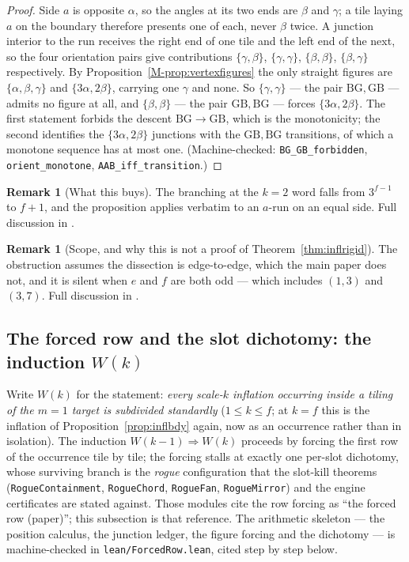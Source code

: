 \documentclass[11pt,reqno]{amsart}
\theoremstyle{plain}
\theoremstyle{definition}
\newtheorem{remark}[theorem]{Remark}
\begin{document}
\begin{proof}
Side $a$ is opposite $\alpha$, so the angles at its two ends are $\beta$ and $\gamma$; a tile laying
$a$ on the boundary therefore presents one of each, never $\beta$ twice. A junction interior to the run
receives the right end of one tile and the left end of the next, so the four orientation pairs give
contributions $\{\gamma,\beta\}$, $\{\gamma,\gamma\}$, $\{\beta,\beta\}$, $\{\beta,\gamma\}$
respectively. By Proposition~\ref{M-prop:vertexfigures} the only straight figures are
$\{\alpha,\beta,\gamma\}$ and $\{3\alpha,2\beta\}$, carrying one $\gamma$ and none. So
$\{\gamma,\gamma\}$ --- the pair $\mathrm{BG},\mathrm{GB}$ --- admits no figure at all, and
$\{\beta,\beta\}$ --- the pair $\mathrm{GB},\mathrm{BG}$ --- forces $\{3\alpha,2\beta\}$. The first
statement forbids the descent $\mathrm{BG}\to\mathrm{GB}$, which is the monotonicity; the second
identifies the $\{3\alpha,2\beta\}$ junctions with the $\mathrm{GB},\mathrm{BG}$ transitions, of which
a monotone sequence has at most one. \textup{(}Machine-checked: \texttt{BG\_GB\_forbidden},
\texttt{orient\_monotone}, \texttt{AAB\_iff\_transition}.\textup{)}
\end{proof}

\begin{remark}[What this buys]\label{rem:orientmono}
The branching at the $k=2$ word falls from $3^{f-1}$ to $f+1$, and the proposition applies verbatim to an $a$-run on an equal side. Full discussion in \cite{Obstructions}.
\end{remark}

\begin{remark}[Scope, and why this is not a proof of Theorem~\ref{thm:inflrigid}]\label{rem:inflparity}
The obstruction assumes the dissection is edge-to-edge, which the main paper does not, and it is silent when $e$ and $f$ are both odd --- which includes $(1,3)$ and $(3,7)$. Full discussion in \cite{Obstructions}.
\end{remark}

\subsection{The forced row and the slot dichotomy: the induction \texorpdfstring{$W(k)$}{W(k)}}\label{sub:forcedrow}

Write $W(k)$ for the statement: \emph{every scale-$k$ inflation occurring inside a tiling of the
$m=1$ target is subdivided standardly} ($1\le k\le f$; at $k=f$ this is the inflation of
Proposition~\ref{prop:inflbdy} again, now as an occurrence rather than in isolation). The
induction $W(k-1)\Rightarrow W(k)$ proceeds by forcing the first row of the occurrence tile by
tile; the forcing stalls at exactly one per-slot dichotomy, whose surviving branch is the
\emph{rogue} configuration that the slot-kill theorems
(\texttt{RogueContainment}, \texttt{RogueChord}, \texttt{RogueFan}, \texttt{RogueMirror}) and the
engine certificates are stated against. Those modules cite the row forcing as ``the forced row
(paper)''; this subsection is that reference. The arithmetic skeleton --- the position calculus,
the junction ledger, the figure forcing and the dichotomy --- is machine-checked in
\textup{\texttt{lean/ForcedRow.lean}}, cited step by step below.
\end{document}
